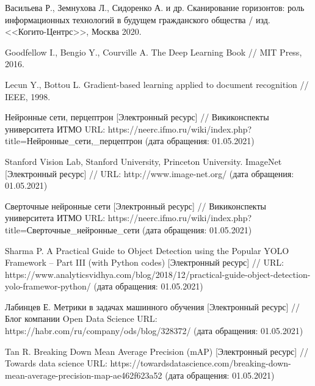 \begingroup 
\renewcommand{\section}[2]{\anonsection{Библиографический список}}
\begin{thebibliography}{00}

    Васильева Р., Земнухова Л., Сидоренко А. и др.
    Сканирование горизонтов: роль информационных технологий в будущем гражданского общества /
    изд. <<Когито-Центрс>>, Москва 2020.

    Goodfellow I., Bengio Y., Courville A.
    The Deep Learning Book //
    MIT Press, 2016.

    Lecun Y., Bottou L.
    Gradient-based learning applied to document recognition //
    IEEE, 1998.

    Нейронные сети, перцептрон
    [Электронный ресурс] //
    Викиконспекты университета ИТМО
    URL: https://neerc.ifmo.ru/wiki/index.php?title=Нейронные\_сети,\_перцептрон
    (дата обращения: 01.05.2021)

    Stanford  Vision  Lab,  Stanford  University,  Princeton  University.  ImageNet 
    [Электронный ресурс] //
    URL: http://www.image-net.org/
    (дата обращения: 01.05.2021)

    Сверточные нейронные сети
    [Электронный ресурс] //
    Викиконспекты университета ИТМО
    URL: https://neerc.ifmo.ru/wiki/index.php?title=Сверточные\_нейронные\_сети
    (дата обращения: 01.05.2021)

    Sharma  P.  A  Practical  Guide  to  Object  Detection  using  the  Popular YOLO Framework – Part  III  (with  Python  codes)
    [Электронный ресурс] //
    URL: https://www.analyticsvidhya.com/blog/2018/12/practical-guide-object-detection-yolo-framewor-python/
    (дата обращения: 01.05.2021)

    Лабинцев  Е.  Метрики в задачах машинного обучения
    [Электронный ресурс] //
    Блог компании Open Data Science
    URL: https://habr.com/ru/company/ods/blog/328372/
    (дата обращения: 01.05.2021)

    Tan R. Breaking Down Mean Average Precision (mAP)
    [Электронный ресурс] //
    Towards data science
    URL: https://towardsdatascience.com/breaking-down-mean-average-precision-map-ae462f623a52
    (дата обращения: 01.05.2021)


\end{thebibliography}
